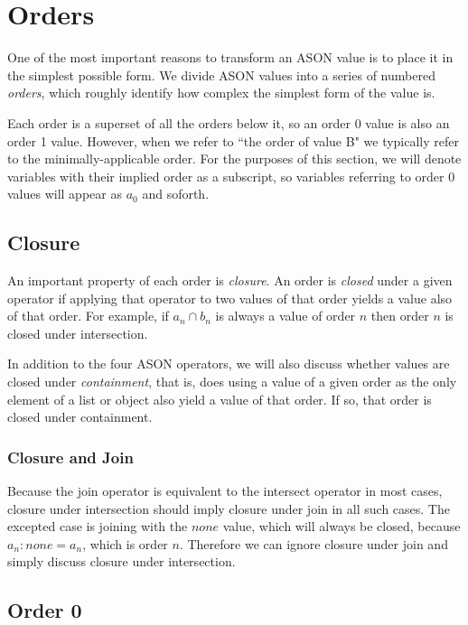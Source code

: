 \documentclass[letterpaper]{article}
\begin{document}
\section{Orders}

One of the most important reasons to transform an ASON value is to place it in
the simplest possible form. We divide ASON values into a series of numbered
\textit{orders}, which roughly identify how complex the simplest form of the
value is.

Each order is a superset of all the orders below it, so an order 0 value is
also an order 1 value. However, when we refer to ``the order of value B" we
typically refer to the minimally-applicable order. For the purposes of this
section, we will denote variables with their implied order as a subscript, so
variables referring to order 0 values will appear as \(a_0\) and soforth.

\subsection{Closure}

An important property of each order is \textit{closure}. An order is
\textit{closed} under a given operator if applying that operator to two values
of that order yields a value also of that order. For example, if \(a_n \cap
b_n\) is always a value of order \(n\) then order \(n\) is closed under
intersection.

In addition to the four ASON operators, we will also discuss whether values are
closed under \textit{containment}, that is, does using a value of a given order
as the only element of a list or object also yield a value of that order. If
so, that order is closed under containment.

\subsubsection{Closure and Join}

Because the join operator is equivalent to the intersect operator in most
cases, closure under intersection should imply closure under join in all such
cases. The excepted case is joining with the \(none\) value, which will always
be closed, because \(a_n : none = a_n\), which is order \(n\). Therefore we can
ignore closure under join and simply discuss closure under intersection.

\subsection{Order 0}
\end{document}
